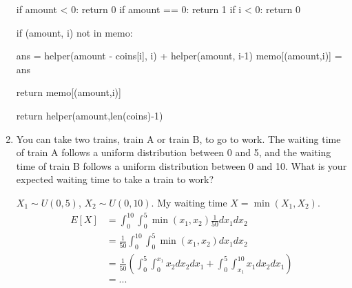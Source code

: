 \documentclass[twoside,12pt]{article}
\begin{document}
\begin{enumerate}
\begin{tcolorbox}
\begin{python}
            if amount < 0:
                return 0
            if amount == 0:
                return 1
            if i < 0:
                return 0
            
            if (amount, i) not in memo:
                
                ans = helper(amount - coins[i], i) + helper(amount, i-1)
                memo[(amount,i)] = ans
            
            return memo[(amount,i)]

        return helper(amount,len(coins)-1)
\end{python}

\end{tcolorbox}

\item You can take two trains, train A or train B, to go to work. The waiting time of train A follows a uniform distribution between 0 and 5, and the waiting time of train B follows a uniform distribution between 0 and 10. What is your expected waiting time to take a train to work? 
\begin{tcolorbox}
$X_1 \sim U(0,5)$, $X_2 \sim U(0,10)$. My waiting time $X = \min(X_1, X_2)$. \\
\begin{align*}
E[X] &= \int_0^{10} \int_0^5 \min(x_1, x_2) \frac 1 {50} dx_1 dx_2 \\
& = \frac 1 {50} \int_0^{10} \int_0^5 \min(x_1, x_2) dx_1 dx_2 \\
& = \frac 1 {50} \left(\int_0^{5} \int_0^{x_1} x_2 dx_2 dx_1 + \int_0^{5} \int_{x_1}^{10} x_1 dx_2 dx_1 \right) \\
& = ...
\end{align*}
\end{tcolorbox}
\end{enumerate}
\end{document}
